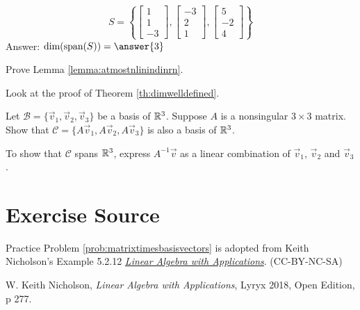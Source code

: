 \documentclass{ximera}
\begin{document}
\begin{problem}
\begin{problem}\label{prob:finddimension3}
$$S=\left\{\begin{bmatrix}1\\1\\-3\end{bmatrix}, \begin{bmatrix}-3\\2\\1\end{bmatrix}, \begin{bmatrix}5\\-2\\4\end{bmatrix}\right\}$$
Answer: $\mbox{dim}(\mbox{span}(S))=\answer{3}$
\end{problem}


\end{problem}

\begin{problem}\label{prob:atmostnlinindinrnproof}
Prove Lemma \ref{lemma:atmostnlinindinrn}.
\begin{hint}
Look at the proof of Theorem \ref{th:dimwelldefined}.
\end{hint}
\end{problem}

\begin{problem}\label{prob:matrixtimesbasisvectors} 
Let $\mathcal{B}=\{\vec{v}_1, \vec{v}_2, \vec{v}_3\}$ be a basis of $\mathbb{R}^3$.  Suppose $A$ is a nonsingular $3\times 3 $ matrix.  Show that $\mathcal{C}=\{A\vec{v}_1, A\vec{v}_2, A\vec{v}_3\}$ is also a basis of $\mathbb{R}^3$. 
\begin{hint}
To show that $\mathcal{C}$ spans $\mathbb{R}^3$, express $A^{-1}\vec{v}$ as a linear combination of $\vec{v}_1$, $\vec{v}_2$ and $\vec{v}_3$.
\end{hint}

\end{problem}



\section*{Exercise Source}
Practice Problem \ref{prob:matrixtimesbasisvectors} is adopted from Keith Nicholson's Example 5.2.12  \href{https://open.umn.edu/opentextbooks/textbooks/linear-algebra-with-applications}{\it Linear Algebra with Applications}. (CC-BY-NC-SA)

W. Keith Nicholson, {\it Linear Algebra with Applications}, Lyryx 2018, Open Edition, p 277.
\end{document}
